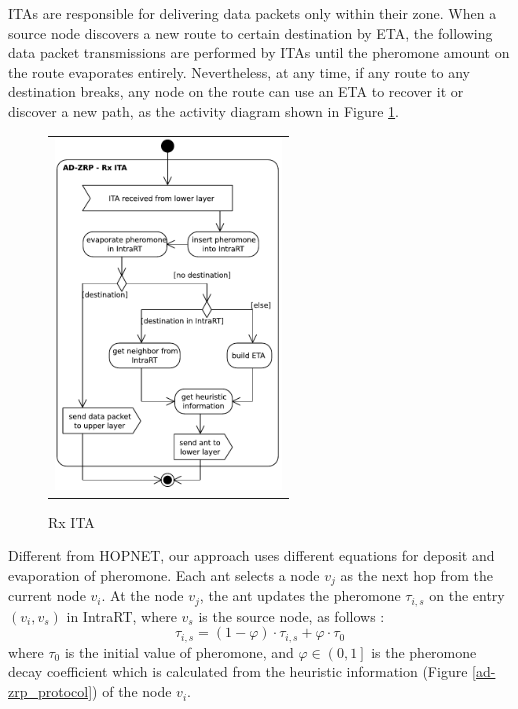 \documentclass[conference]{IEEEtran}
\begin{document}
ITAs are responsible for delivering data packets only within their zone.
When a source node discovers a new route to certain destination by ETA, the following data packet transmissions are performed by ITAs until the pheromone amount on the route evaporates entirely.
Nevertheless, at any time, if any route to any destination breaks, any node on the route can use an ETA to recover it or discover a new path, as the activity diagram shown in Figure \ref{ad-zrp_rx_ita}.

\begin{figure}[htb]
\centering
\begin{tabular}{c}
\includegraphics[width=170pt]{fig/ad-zrp_rx_ita.pdf}
\end{tabular}
\caption{Rx ITA}
\label{ad-zrp_rx_ita}
\end{figure}

Different from HOPNET, our approach uses different equations for deposit and evaporation of pheromone.
Each ant selects a node $v_{j}$ as the next hop from the current node $v_{i}$.
At the node $v_{j}$, the ant updates the pheromone $\tau _{i,s}$ on the entry $\left ( v_{i},v_{s} \right )$ in IntraRT, where $v_{s}$ is the source node, as follows \cite{Dorigo:2006}:
\begin{equation} \tau _{i,s} = \left ( 1 - \varphi \right ) \cdot \tau _{i,s} + \varphi \cdot \tau _{0} \label{ad-zrp_pheromone_increasing} \end{equation}
where $\tau _{0}$ is the initial value of pheromone, and $\varphi \in \left ( 0,1  \right ]$ is the pheromone decay coefficient which is calculated from the heuristic information (Figure \ref{ad-zrp_protocol}) of the node $v_{i}$.
\end{document}
